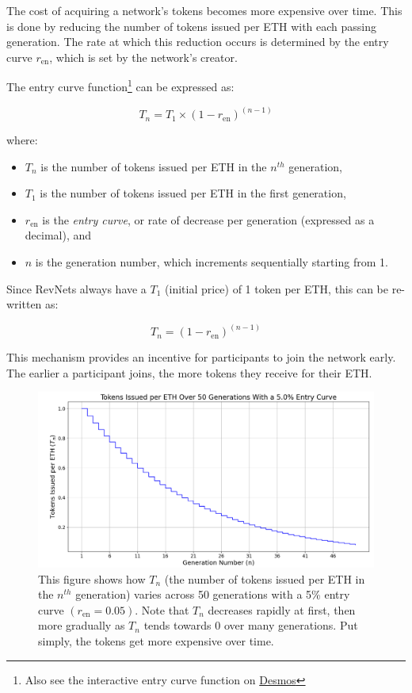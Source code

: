 \documentclass{article}
\begin{document}
The cost of acquiring a network's tokens becomes more expensive over time. This is done by reducing the number of tokens issued per ETH with each passing generation. The rate at which this reduction occurs is determined by the entry curve $r_{\text{en}}$, which is set by the network's creator.

The entry curve function\footnote{Also see the interactive entry curve function on \href{https://www.desmos.com/calculator/ey9fhuslwe}{Desmos}} can be expressed as:

\begin{equation}
  T_n = T_1 \times (1 - r_{\text{en}})^{(n - 1)}
\end{equation}

where:
\begin{itemize}
  \item $T_n$ is the number of tokens issued per ETH in the $n^{th}$ generation,
  \item $T_1$ is the number of tokens issued per ETH in the first generation,
  \item $r_{\text{en}}$ is the \textit{entry curve}, or rate of decrease per generation (expressed as a decimal), and
  \item $n$ is the generation number, which increments sequentially starting from 1.
\end{itemize}

Since RevNets always have a $T_1$ (initial price) of 1 token per ETH, this can be re-written as:

\begin{equation}
  T_n = (1 - r_{\text{en}})^{(n - 1)}
\end{equation}

This mechanism provides an incentive for participants to join the network early. The earlier a participant joins, the more tokens they receive for their ETH.

\begin{figure}[h]
  \centering
  \includegraphics[width=\textwidth]{figures/single-entry-curve.png}
   \caption{This figure shows how $T_n$ (the number of tokens issued per ETH in the $n^{th}$ generation) varies across 50 generations with a 5\% entry curve $(r_{\text{en}} = 0.05)$. Note that $T_n$ decreases rapidly at first, then more gradually as $T_n$ tends towards 0 over many generations. Put simply, the tokens get more expensive over time.}
\end{figure}
\end{document}
